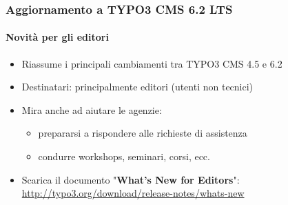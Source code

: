 \begin{frame}[fragile]
	\frametitle{Aggiornamento a TYPO3 CMS 6.2 LTS}
	\framesubtitle{Novità per gli editori}

	\begin{itemize}
		\item Riassume i principali cambiamenti  tra TYPO3 CMS 4.5 e 6.2
		\item Destinatari: principalmente editori (utenti non tecnici)
		\item Mira anche ad aiutare le agenzie:

			\begin{itemize}
				\item prepararsi a rispondere alle richieste di assistenza
				\item condurre workshops, seminari, corsi, ecc.
			\end{itemize}

		\item Scarica il documento "\textbf{What's New for Editors}":\newline
			\smaller\url{http://typo3.org/download/release-notes/whats-new}\normalsize

	\end{itemize}

\end{frame}


